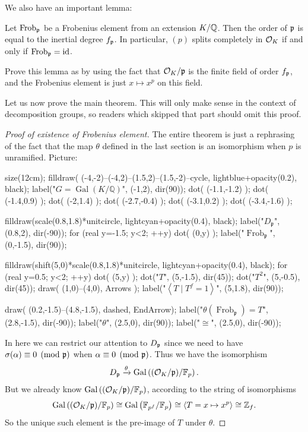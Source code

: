 We also have an important lemma:
\begin{lemma}
	Let $\mathrm{Frob}_\mathfrak p$ be a Frobenius element from an extension $K/\mathbb Q$.
	Then the order of $\mathfrak p$ is equal to the inertial degree $f_\mathfrak p$.
	In particular, $(p)$ splits completely in $\mathcal O_K$
	if and only if $\mathrm{Frob}_\mathfrak p = \mathrm{id}$.
\end{lemma}
\begin{exercise}
	Prove this lemma as by using the fact that $\mathcal O_K / \mathfrak p$
	is the finite field of order $f_\mathfrak p$,
	and the Frobenius element is just $x \mapsto x^p$ on this field.
\end{exercise}

Let us now prove the main theorem.
This will only make sense in the context of decomposition groups,
so readers which skipped that part should omit this proof.
\begin{proof}
	[Proof of existence of Frobenius element]
	The entire theorem is just a rephrasing of the fact
	that the map $\theta$ defined in the last section
	is an isomorphism when $p$ is unramified.
	Picture:
	\begin{center}
		\begin{asy}
			size(12cm);
			filldraw( (-4,-2)--(-4,2)--(1.5,2)--(1.5,-2)--cycle, lightblue+opacity(0.2), black);
			label("$G = \operatorname{Gal}(K/\mathbb Q)$", (-1,2), dir(90));
			dot( (-1.1,-1.2) );
			dot( (-1.4,0.9) );
			dot( (-2,1.4) );
			dot( (-2.7,-0.4) );
			dot( (-3.1,0.2) );
			dot( (-3.4,-1.6) );

			filldraw(scale(0.8,1.8)*unitcircle, lightcyan+opacity(0.4), black);
			label("$D_{\mathfrak p}$", (0.8,2), dir(-90));
			for (real y=-1.5; y<2; ++y) { dot( (0,y) ); }
			label("$\operatorname{Frob}_{\mathfrak p}$", (0,-1.5), dir(90));

			filldraw(shift(5,0)*scale(0.8,1.8)*unitcircle, lightcyan+opacity(0.4), black);
			for (real y=0.5; y<2; ++y) { dot( (5,y) ); }
			dot("$T$", (5,-1.5), dir(45));
			dot("$T^2$", (5,-0.5), dir(45));
			draw( (1,0)--(4,0), Arrows );
			label("$\left<T \mid T^f=1\right>$", (5,1.8), dir(90));

			draw( (0.2,-1.5)--(4.8,-1.5), dashed, EndArrow);
			label("$\theta(\operatorname{Frob}_{\mathfrak p}) = T$", (2.8,-1.5), dir(-90));
			label("$\theta$", (2.5,0), dir(90));
			label("$\cong$", (2.5,0), dir(-90));
		\end{asy}
	\end{center}
	In here we can restrict our attention to $D_\mathfrak p$
	since we need to have $\sigma(\alpha) \equiv 0 \pmod {\mathfrak p}$
	when $\alpha \equiv 0 \pmod {\mathfrak p}$.
	Thus we have the isomorphism
	\[ D_\mathfrak p \xrightarrow{\theta} \operatorname{Gal}\left( (\mathcal O_K/\mathfrak p) / \mathbb F_p \right). \]
	But we already know $\operatorname{Gal}\left( (\mathcal O_K/\mathfrak p)/\mathbb F_p \right)$,
	according to the string of isomorphisms
	\[
		\operatorname{Gal}\left( (\mathcal O_K/\mathfrak p) / \mathbb F_p \right)
		\cong \operatorname{Gal}\left( \mathbb F_{p^f} / \mathbb F_p \right)
		\cong \left< T = x \mapsto x^p \right>
		\cong \mathbb Z_{f} .
	\]
	So the unique such element is the pre-image of $T$ under $\theta$.
\end{proof}


